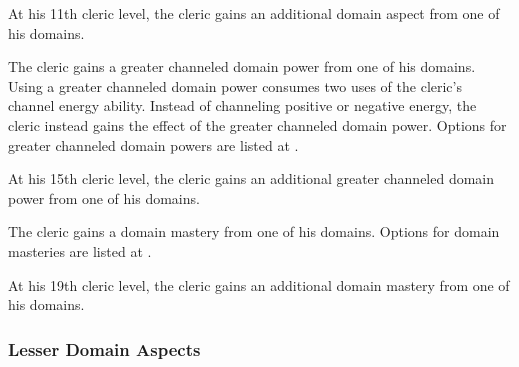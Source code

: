 At his 11th cleric level, the cleric gains an additional domain aspect from one of his domains.

 The cleric gains a greater channeled domain power from one of his domains. Using a greater channeled domain power consumes two uses of the cleric's channel energy ability. Instead of channeling positive or negative energy, the cleric instead gains the effect of the greater channeled domain power. Options for greater channeled domain powers are listed at .

At his 15th cleric level, the cleric gains an additional greater channeled domain power from one of his domains.

 The cleric gains a domain mastery from one of his domains. Options for domain masteries are listed at .

At his 19th cleric level, the cleric gains an additional domain mastery from one of his domains.


\subsubsection{Lesser Domain Aspects}\label{Lesser Domain Aspects}

